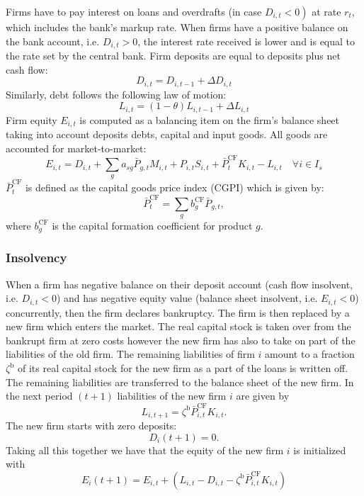 Firms have to pay interest on loans and overdrafts (in case $\left.D_{i,t}<0\right)$ at rate $r_t$, which includes the bank's markup rate. When firms have a positive balance on the bank account, i.e. $D_{i,t}>0$, the interest rate received is lower and is equal to the rate set by the central bank.
Firm deposits are equal to deposits plus net cash flow:
\begin{equation}
    D_{i,t}=D_{i,t-1}+\Delta D_{i,t}
\end{equation}
Similarly, debt follows the following law of motion:
\begin{equation}
    L_{i,t}=(1-\theta) L_{i,t-1}+\Delta L_{i,t}
\end{equation}
Firm equity $E_{i,t}$ is computed as a balancing item on the firm's balance sheet taking into account deposits debts, capital and input goods. All goods are accounted for market-to-market:
\begin{equation}
    E_{i,t}=D_{i,t}+\sum_g a_{s g} \bar{P}_{g,t} M_{i,t}+P_{i,t} S_{i,t}+\bar{P}^{\mathrm{CF}}_t  K_{i,t}-L_{i,t} \quad \forall i \in I_s
\end{equation}
$\bar{P}^{\mathrm{CF}}_t $ is defined as the capital goods price index (CGPI) which is given by:
\begin{equation}
    \bar{P}^{\mathrm{CF}}_t =\sum_g b_g^{\mathrm{CF}} \bar{P}_{g,t},
\end{equation}
where $b_g^{\mathrm{CF}}$ is the capital formation coefficient for product $g$.
\subsubsection{Insolvency}
When a firm has negative balance on their deposit account (cash flow insolvent, i.e. $D_{i,t}<0$) and has negative equity value (balance sheet insolvent, i.e. $E_{i,t}<0$) concurrently, then the firm declares bankruptcy. The firm is then replaced by a new firm which enters the market. The real capital stock is taken over from the bankrupt firm at zero costs however the new firm has also to take on part of the liabilities of the old firm.  The remaining liabilities of firm $i$ amount to a fraction $\zeta^{\mathrm{b}}$ of its real capital stock for the new firm as a part of the loans is written off. The remaining liabilities are transferred to the balance sheet of the new firm. In the next period $(t+1)$ liabilities of the new firm $i$ are given by
\begin{equation}
    L_{i,t+1}=\zeta^{\mathrm{b}} \bar{P}_{i,t}^{\mathrm{CF}} K_{i,t}.
\end{equation}
The new firm starts with zero deposits:
\begin{equation}
    D_i(t+1)=0.
\end{equation}
Taking all this together we have that the equity of the new firm $i$ is initialized with
\begin{equation}
    E_i(t+1)=E_{i,t}+\left(L_{i,t}-D_{i,t}-\zeta^{\mathrm{b}} \bar{P}_{i,t}^{\mathrm{CF}} K_{i,t}\right)
\end{equation}

